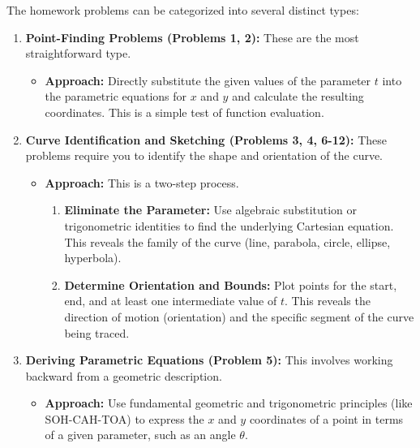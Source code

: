 \documentclass{article}
\begin{document}
The homework problems can be categorized into several distinct types:

\begin{enumerate}
    \item \textbf{Point-Finding Problems (Problems 1, 2):} These are the most straightforward type.
        \begin{itemize}
            \item \textbf{Approach:} Directly substitute the given values of the parameter $t$ into the parametric equations for $x$ and $y$ and calculate the resulting coordinates. This is a simple test of function evaluation.
        \end{itemize}

    \item \textbf{Curve Identification and Sketching (Problems 3, 4, 6-12):} These problems require you to identify the shape and orientation of the curve.
        \begin{itemize}
            \item \textbf{Approach:} This is a two-step process.
            \begin{enumerate}
                \item \textbf{Eliminate the Parameter:} Use algebraic substitution or trigonometric identities to find the underlying Cartesian equation. This reveals the family of the curve (line, parabola, circle, ellipse, hyperbola).
                \item \textbf{Determine Orientation and Bounds:} Plot points for the start, end, and at least one intermediate value of $t$. This reveals the direction of motion (orientation) and the specific segment of the curve being traced.
            \end{enumerate}
        \end{itemize}

    \item \textbf{Deriving Parametric Equations (Problem 5):} This involves working backward from a geometric description.
        \begin{itemize}
            \item \textbf{Approach:} Use fundamental geometric and trigonometric principles (like SOH-CAH-TOA) to express the $x$ and $y$ coordinates of a point in terms of a given parameter, such as an angle $\theta$.
        \end{itemize}


\end{enumerate}
\end{document}
